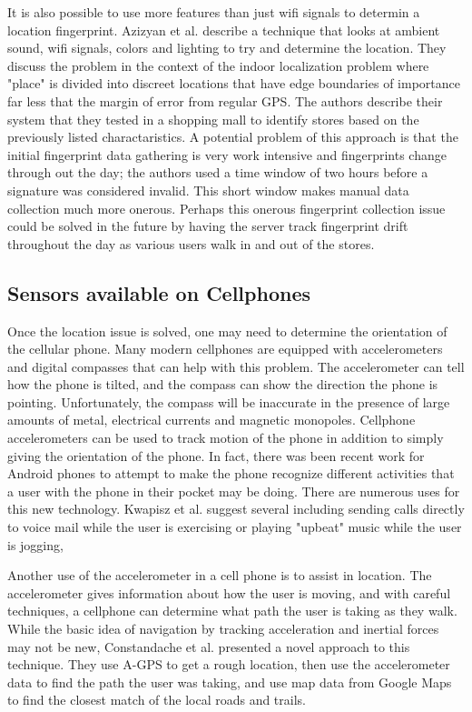\documentclass{acm_proc_article-sp}
\begin{document}
It is also possible to use more features than just wifi signals to determin a location fingerprint. Azizyan et al. describe a technique that looks at ambient sound, wifi signals, colors and lighting to try and determine the location.   They discuss the problem in the context of the indoor localization problem where "place" is divided into discreet locations that have edge boundaries of importance far less that the margin of error from regular GPS.  The authors describe their system that they tested in a shopping mall to identify stores based on the previously listed charactaristics.  A potential problem of this approach is that the initial fingerprint data gathering is very work intensive and fingerprints change through out the day; the authors used a time window of two hours before a signature was considered invalid.  This short window makes manual data collection much more onerous. \cite{azizyan2009surroundsense}  Perhaps this onerous fingerprint collection issue could be solved in the future by having the server track fingerprint drift throughout the day as various users walk in and out of the stores.

\subsection{Sensors available on Cellphones}

Once the location issue is solved, one may need to determine the orientation of the cellular phone. Many modern cellphones are equipped with  accelerometers and digital compasses that can help with this problem.  The accelerometer can tell how the phone is tilted, and the compass can show the direction the phone is pointing.  Unfortunately, the compass will be inaccurate in the presence of large amounts of metal, electrical currents \cite{karpischek2009swisspeaks} and magnetic monopoles.  Cellphone accelerometers can be used to track motion of the phone in addition to simply giving the orientation of the phone.  In fact, there was been recent work for Android phones to attempt to make the phone recognize different activities that a user with the phone in their pocket may be doing.  \cite{kwapisz2010activity}  There are numerous uses for this new technology.  Kwapisz et al. suggest several including sending calls directly to voice mail while the user is exercising or playing "upbeat" music while the user is jogging,

Another use of the accelerometer in a cell phone is to assist in location.  The accelerometer gives information about how the user is moving, and with careful techniques, a cellphone can determine what path the user is taking as they walk. While the basic idea of navigation by tracking acceleration and inertial forces may not be new, \cite{farrell1999global} \cite{gustafsson2002particle} Constandache et al. presented a novel approach to this technique. They use A-GPS to get a rough location, then use the accelerometer data to find the path the user was taking, and use map data from Google Maps to find the closest match of the local roads and trails.   \cite{constandache2010towards}
\end{document}
